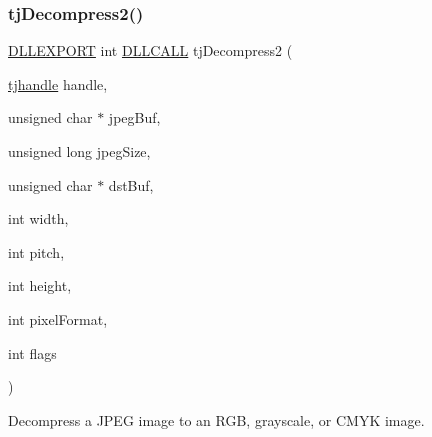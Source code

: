 \subsubsection{\texorpdfstring{tj\+Decompress2()}{tjDecompress2()}}
{\footnotesize\ttfamily \hyperlink{turbojpeg_8h_a808e08638be3cba36e36759e5b150de0}{D\+L\+L\+E\+X\+P\+O\+RT} int \hyperlink{turbojpeg_8h_a54b25836118bfac94a53a7b790f3ccb2}{D\+L\+L\+C\+A\+LL} tj\+Decompress2 (\begin{DoxyParamCaption}\item[{\hyperlink{group___turbo_j_p_e_g_ga758d2634ecb4949de7815cba621f5763}{tjhandle}}]{handle,  }\item[{unsigned char $\ast$}]{jpeg\+Buf,  }\item[{unsigned long}]{jpeg\+Size,  }\item[{unsigned char $\ast$}]{dst\+Buf,  }\item[{int}]{width,  }\item[{int}]{pitch,  }\item[{int}]{height,  }\item[{int}]{pixel\+Format,  }\item[{int}]{flags }\end{DoxyParamCaption})}

Decompress a J\+P\+EG image to an R\+GB, grayscale, or C\+M\+YK image.


